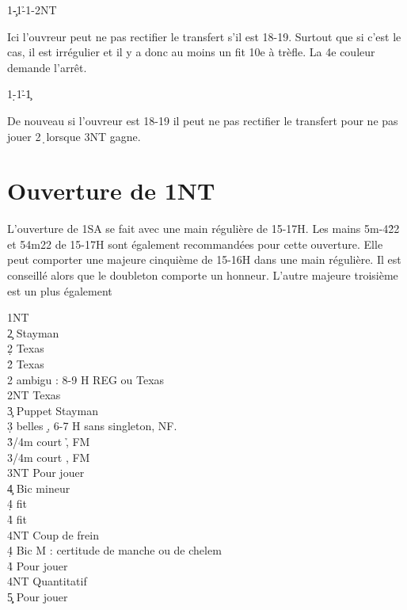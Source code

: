 \documentclass[a4paper]{article}
\begin{document}
\begin{bidtable}
1\c-1\h-1\s-2NT
\end{bidtable}

Ici l'ouvreur peut ne pas rectifier le transfert s'il est 18-19. Surtout que si c'est le cas, il est irrégulier
et il y a donc au moins un fit 10e à trèfle. La 4e couleur demande l'arrêt.

\begin{bidtable}
1\d-1\h-1\c
\end{bidtable}

De nouveau si l'ouvreur est 18-19 il peut ne pas rectifier le transfert pour ne pas jouer 2\d\ lorsque 3NT gagne.

\section{Ouverture de 1NT}

L’ouverture de 1SA se fait avec une main régulière de 15-17H. 
Les mains 5m-4\h 22 et 54m22 de 15-17H sont également recommandées pour cette 
ouverture.
Elle peut comporter une majeure cinquième de 15-16H dans une main régulière. Il est 
conseillé alors que le doubleton comporte un honneur. L’autre majeure troisième est un plus 
également

\begin{bidtable}
1NT\+\\
2\c \> Stayman\\
2\d \> Texas \h \\
2\h \> Texas \s \\
2\s \> ambigu : 8-9 H REG ou Texas \c \\
2NT \> Texas \d \\
3\c \> Puppet Stayman\\
3\d {} belles \d , 6-7 H sans singleton, NF.\\
3\h {}/4m court \h , FM\\
3\s {}/4m court \s , FM\\
3NT \> Pour jouer\\
4\c \> Bic mineur\+\\
4\d \> fit \d \\
4\h\s \> fit \c \\
4NT \> Coup de frein\-\\
4\d \> Bic M : certitude de manche ou de chelem\\
4\h\s \> Pour jouer\\
4NT \> Quantitatif\\
5\c\d \> Pour jouer\-
\end{bidtable}
\end{document}
